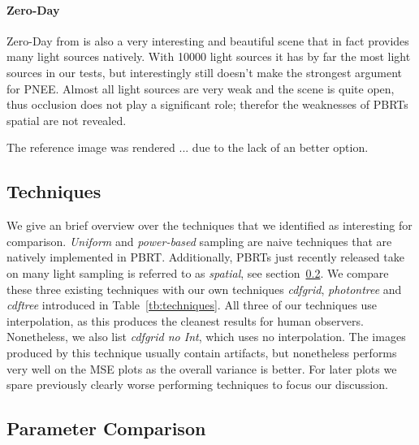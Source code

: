 \paragraph{Zero-Day}

Zero-Day from \textcite{Beeple} is also a very interesting and beautiful scene that in fact provides many light sources natively. With 10000 light sources it has by far the most light sources in our tests, but interestingly still doesn't make the strongest argument for PNEE. Almost all light sources are very weak and the scene is quite open, thus occlusion does not play a significant role; therefor the weaknesses of PBRTs spatial are not revealed.

The reference image was rendered ... due to the lack of an better option.




\subsection{Techniques}

We give an brief overview over the techniques that we identified as interesting for comparison. \textit{Uniform} and \textit{power-based} sampling are naive techniques that are natively implemented in PBRT. Additionally, PBRTs just recently released take on many light sampling is referred to as \textit{spatial}, see section~\ref{}. We compare these three existing techniques with our own techniques \textit{cdfgrid}, \textit{photontree} and \textit{cdftree} introduced in Table~\ref{tb:techniques}. All three of our techniques use interpolation, as this produces the cleanest results for human observers. Nonetheless, we also list \textit{cdfgrid no Int}, which uses no interpolation. The images produced by this technique usually contain artifacts, but nonetheless performs very well on the MSE plots as the overall variance is better. For later plots we spare previously clearly worse performing techniques to focus our discussion.

\subsection{Parameter Comparison}


\label{ch:ev:photontree}

